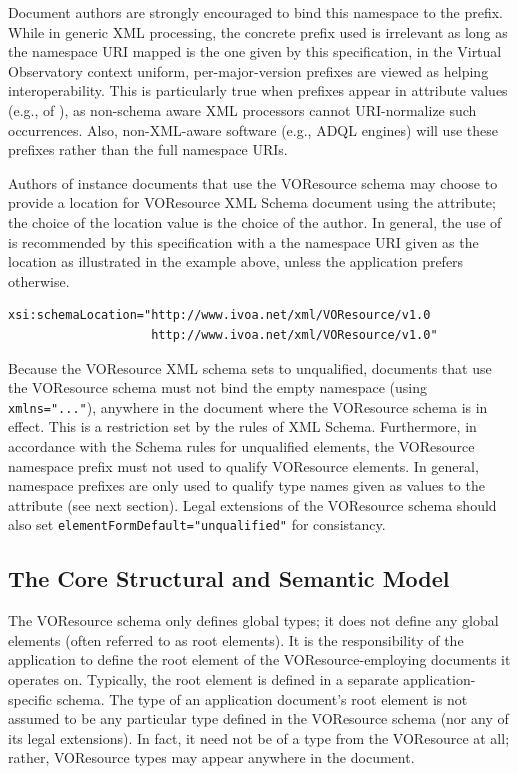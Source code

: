\documentclass[11pt,a4paper]{ivoa}
\begin{document}
Document authors are strongly encouraged to bind this namespace to the
 prefix.  While in generic XML processing, the concrete
prefix used is irrelevant as long as the namespace URI mapped is the one
given by this specification, in the Virtual Observatory context uniform,
per-major-version prefixes are viewed as helping interoperability.  This
is particularly true when prefixes appear in attribute values (e.g.,
of ), as non-schema aware XML processors cannot
URI-normalize such occurrences.  Also, non-XML-aware software (e.g., ADQL
engines) will use these prefixes rather than the full namespace URIs.

Authors of instance documents that use the VOResource schema may choose
to provide a location for VOResource XML Schema document using the
 attribute; the choice of the location value
is the choice of the author.  In general, the use of
 is recommended by this specification with
a the namespace URI given as the location as illustrated in the example
above, unless the application prefers otherwise.


\begin{verbatim}
xsi:schemaLocation="http://www.ivoa.net/xml/VOResource/v1.0
                    http://www.ivoa.net/xml/VOResource/v1.0"
\end{verbatim}

Because the VOResource XML schema sets  to
unqualified, documents that use the VOResource schema must not bind the
empty namespace (using \verb|xmlns="..."|), anywhere in the document
where the VOResource schema is in effect.  This is a restriction set by
the rules of XML Schema.  Furthermore, in accordance with the Schema
rules for unqualified elements, the VOResource namespace prefix must not
used to qualify VOResource elements.  In general, namespace prefixes are
only used to qualify type names given as values to the 
attribute (see next section).  Legal extensions of the VOResource schema
should also set \verb|elementFormDefault="unqualified"| for consistancy.



\subsection{The Core Structural and Semantic Model}
\label{sect:core}

The VOResource schema only defines global types; it does not define
any global elements (often referred to as root elements).  It is the
responsibility of the application to define the root element of the
VOResource-employing documents it operates on.  Typically, the root
element is defined in a separate application-specific schema.  The
type of an application document's root element is not assumed to be
any particular type defined in the VOResource schema (nor any of its
legal extensions).  In fact, it need not be of a type from the
VOResource at all; rather, VOResource types may appear anywhere in the
document.   
\end{document}
